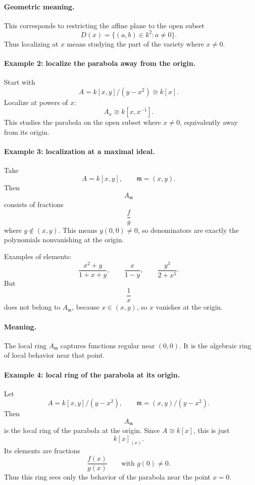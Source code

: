 \documentclass[12pt,a4paper]{article}
\theoremstyle{plain}
\theoremstyle{definition}      %
\begin{document}
	\paragraph{Geometric meaning.}
	This corresponds to restricting the affine plane to the open subset
	\[
	D(x)=\{(a,b)\in k^2 : a\neq 0\}.
	\]
	Thus localizing at \(x\) means studying the part of the variety where \(x\neq 0\).
	
	\paragraph{Example 2: localize the parabola away from the origin.}
	Start with
	\[
	A=k[x,y]/(y-x^2)\cong k[x].
	\]
	Localize at powers of \(x\):
	\[
	A_x\cong k[x,x^{-1}].
	\]
	This studies the parabola on the open subset where \(x\neq 0\), equivalently away from its origin.
	
	\paragraph{Example 3: localization at a maximal ideal.}
	Take
	\[
	A=k[x,y], \qquad \mathfrak m=(x,y).
	\]
	Then
	\[
	A_{\mathfrak m}
	\]
	consists of fractions
	\[
	\frac{f}{g}
	\]
	where \(g\notin (x,y)\). This means \(g(0,0)\neq 0\), so denominators are exactly the polynomials nonvanishing at the origin.
	
	Examples of elements:
	\[
	\frac{x^2+y}{1+x+y},
	\qquad
	\frac{x}{1-y},
	\qquad
	\frac{y^3}{2+x^5}.
	\]
	But
	\[
	\frac{1}{x}
	\]
	does not belong to \(A_{\mathfrak m}\), because \(x\in (x,y)\), so \(x\) vanishes at the origin.
	
	\paragraph{Meaning.}
	The local ring \(A_{\mathfrak m}\) captures functions regular near \((0,0)\). It is the algebraic ring of local behavior near that point.
	
	\paragraph{Example 4: local ring of the parabola at its origin.}
	Let
	\[
	A=k[x,y]/(y-x^2),
	\qquad
	\mathfrak m=(x,y)/(y-x^2).
	\]
	Then
	\[
	A_{\mathfrak m}
	\]
	is the local ring of the parabola at the origin. Since \(A\cong k[x]\), this is just
	\[
	k[x]_{(x)}.
	\]
	Its elements are fractions
	\[
	\frac{f(x)}{g(x)}
	\qquad \text{with } g(0)\neq 0.
	\]
	Thus this ring sees only the behavior of the parabola near the point \(x=0\).
	
\end{document}

